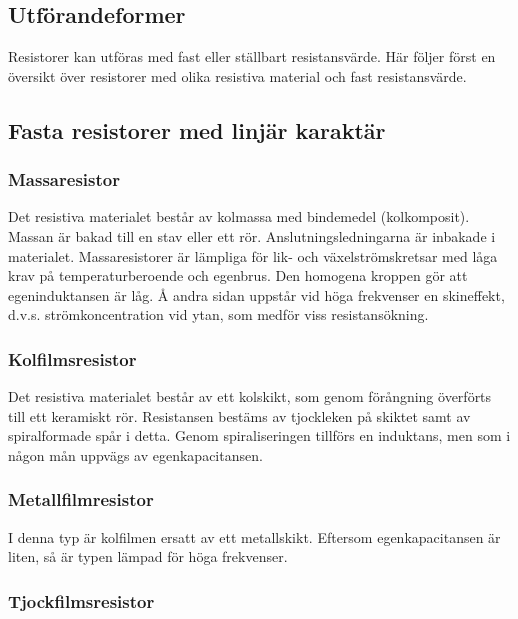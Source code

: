 \subsection{Utförandeformer}

Resistorer kan utföras med fast eller ställbart resistansvärde. Här följer
först en översikt över resistorer med olika resistiva material och fast
resistansvärde.

\subsection{Fasta resistorer med linjär karaktär}

\subsubsection{Massaresistor}

Det resistiva materialet består av kolmassa med bindemedel (kolkomposit).
Massan är bakad till en stav eller ett rör. Anslutningsledningarna är inbakade
i materialet. Massaresistorer är lämpliga för lik- och växelströmskretsar med
låga krav på temperaturberoende och egenbrus. Den homogena kroppen gör att
egeninduktansen är låg. Å andra sidan uppstår vid höga frekvenser en
skineffekt, d.v.s. strömkoncentration vid ytan, som medför viss resistansökning.

\subsubsection{Kolfilmsresistor}

Det resistiva materialet består av ett kolskikt, som genom förångning överförts
till ett keramiskt rör. Resistansen bestäms av tjockleken på skiktet samt av
spiralformade spår i detta. Genom spiraliseringen tillförs en induktans, men
som i någon mån uppvägs av egenkapacitansen.

\subsubsection{Metallfilmresistor}

I denna typ är kolfilmen ersatt av ett metallskikt. Eftersom egenkapacitansen
är liten, så är typen lämpad för höga frekvenser.

\subsubsection{Tjockfilmsresistor}

